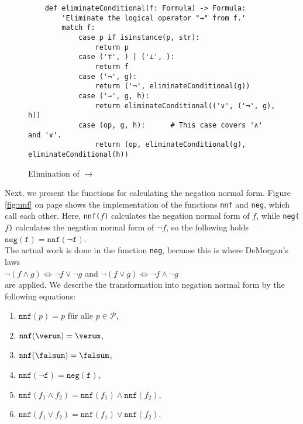 \begin{figure}[!ht]
  \centering
\begin{verbatim}
    def eliminateConditional(f: Formula) -> Formula:
        'Eliminate the logical operator "→" from f.'
        match f:
            case p if isinstance(p, str): 
                return p
            case ('⊤', ) | ('⊥', ):
                return f
            case ('¬', g):
                return ('¬', eliminateConditional(g))
            case ('→', g, h): 
                return eliminateConditional(('∨', ('¬', g), h))
            case (op, g, h):      # This case covers '∧' and '∨'.
                return (op, eliminateConditional(g), eliminateConditional(h))
\end{verbatim}
\vspace*{-0.3cm}
  \caption{Elimination of $\rightarrow$}
  \label{fig:eliminate-folgt}
\end{figure}
\pagebreak
Next, we present the functions for calculating the negation normal form.
Figure
\ref{fig:nnf} on page \pageref{fig:nnf} shows the implementation of the functions
\texttt{nnf} and \texttt{neg},
which call each other.  Here, \texttt{nnf($f$)} calculates the negation normal form of $f$, while  
\texttt{neg($f$)} calculates the negation normal form of $\neg f$, so the following holds
\\[0.2cm]
\hspace*{1.3cm}
$\texttt{neg}(\texttt{f}) = \texttt{nnf}(\neg \texttt{f})$.
\\[0.2cm]
 The actual work is done in the
function \texttt{neg}, because this is where DeMorgan's laws 
\\[0.2cm]
\hspace*{1.3cm}
$\neg (f \wedge g) \Leftrightarrow \neg f \vee \neg g$ \quad and \quad 
$\neg (f \vee g) \Leftrightarrow \neg f \wedge \neg g$ 
\\[0.2cm]
are applied.  We describe the transformation into negation normal form by 
the following equations: 
\begin{enumerate}
\item $\texttt{nnf}(p) = p$ \quad für alle $p \in \mathcal{P}$,
\item $\texttt{nnf}(\verum) = \verum$,
\item $\texttt{nnf}(\falsum) = \falsum$,
\item $\texttt{nnf}(\neg \texttt{f}) = \texttt{neg}(\texttt{f})$,
\item $\texttt{nnf}(f_1 \wedge f_2) = \texttt{nnf}(f_1) \wedge \texttt{nnf}(f_2)$,
\item $\texttt{nnf}(f_1 \vee f_2) = \texttt{nnf}(f_1) \vee \texttt{nnf}(f_2)$.
\end{enumerate}

